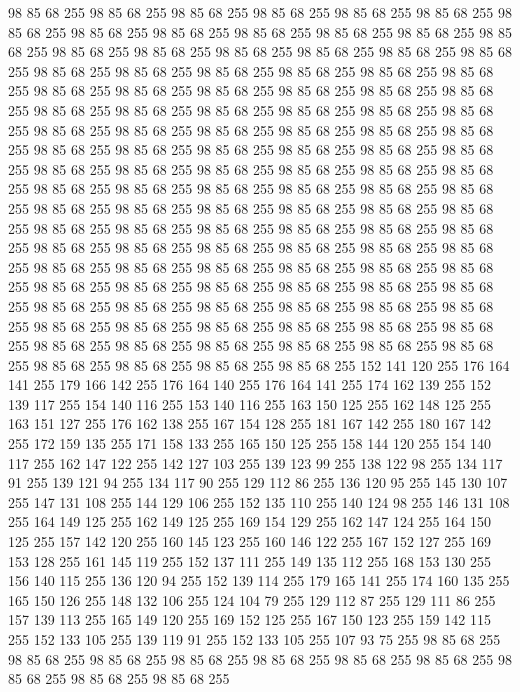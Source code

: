 98 85 68 255 98 85 68 255 98 85 68 255 98 85 68 255 98 85 68 255 98 85 68 255 98 85 68 255 98 85 68 255 98 85 68 255 98 85 68 255 98 85 68 255 98 85 68 255 98 85 68 255 98 85 68 255 98 85 68 255 98 85 68 255 98 85 68 255 98 85 68 255 98 85 68 255 98 85 68 255 98 85 68 255 98 85 68 255 98 85 68 255 98 85 68 255 98 85 68 255 98 85 68 255 98 85 68 255 98 85 68 255 98 85 68 255 98 85 68 255 98 85 68 255 98 85 68 255 98 85 68 255 98 85 68 255 98 85 68 255 98 85 68 255 98 85 68 255 98 85 68 255 98 85 68 255 98 85 68 255 98 85 68 255 98 85 68 255 98 85 68 255 98 85 68 255 98 85 68 255 98 85 68 255 98 85 68 255 98 85 68 255 98 85 68 255 98 85 68 255 98 85 68 255 98 85 68 255 98 85 68 255 98 85 68 255 98 85 68 255 98 85 68 255 98 85 68 255 98 85 68 255 98 85 68 255 98 85 68 255 98 85 68 255 98 85 68 255 98 85 68 255 98 85 68 255
98 85 68 255 98 85 68 255 98 85 68 255 98 85 68 255 98 85 68 255 98 85 68 255 98 85 68 255 98 85 68 255 98 85 68 255 98 85 68 255 98 85 68 255 98 85 68 255 98 85 68 255 98 85 68 255 98 85 68 255 98 85 68 255 98 85 68 255 98 85 68 255 98 85 68 255 98 85 68 255 98 85 68 255 98 85 68 255 98 85 68 255 98 85 68 255 98 85 68 255 98 85 68 255 98 85 68 255 98 85 68 255 98 85 68 255 98 85 68 255 98 85 68 255 98 85 68 255 98 85 68 255 98 85 68 255 98 85 68 255 98 85 68 255 98 85 68 255 98 85 68 255 98 85 68 255 98 85 68 255 98 85 68 255 98 85 68 255 98 85 68 255 98 85 68 255 98 85 68 255 98 85 68 255 98 85 68 255 98 85 68 255 98 85 68 255 152 141 120 255 176 164 141 255 179 166 142 255 176 164 140 255 176 164 141 255 174 162 139 255 152 139 117 255 154 140 116 255 153 140 116 255 163 150 125 255 162 148 125 255 163 151 127 255 176 162 138 255 167 154 128 255 181 167 142 255
180 167 142 255 172 159 135 255 171 158 133 255 165 150 125 255 158 144 120 255 154 140 117 255 162 147 122 255 142 127 103 255 139 123 99 255 138 122 98 255 134 117 91 255 139 121 94 255 134 117 90 255 129 112 86 255 136 120 95 255 145 130 107 255 147 131 108 255 144 129 106 255 152 135 110 255 140 124 98 255 146 131 108 255 164 149 125 255 162 149 125 255 169 154 129 255 162 147 124 255 164 150 125 255 157 142 120 255 160 145 123 255 160 146 122 255 167 152 127 255 169 153 128 255 161 145 119 255 152 137 111 255 149 135 112 255 168 153 130 255 156 140 115 255 136 120 94 255 152 139 114 255 179 165 141 255 174 160 135 255 165 150 126 255 148 132 106 255 124 104 79 255 129 112 87 255 129 111 86 255 157 139 113 255 165 149 120 255 169 152 125 255 167 150 123 255 159 142 115 255 152 133 105 255 139 119 91 255 152 133 105 255 107 93 75 255 98 85 68 255 98 85 68 255 98 85 68 255 98 85 68 255 98 85 68 255 98 85 68 255 98 85 68 255 98 85 68 255 98 85 68 255 98 85 68 255
